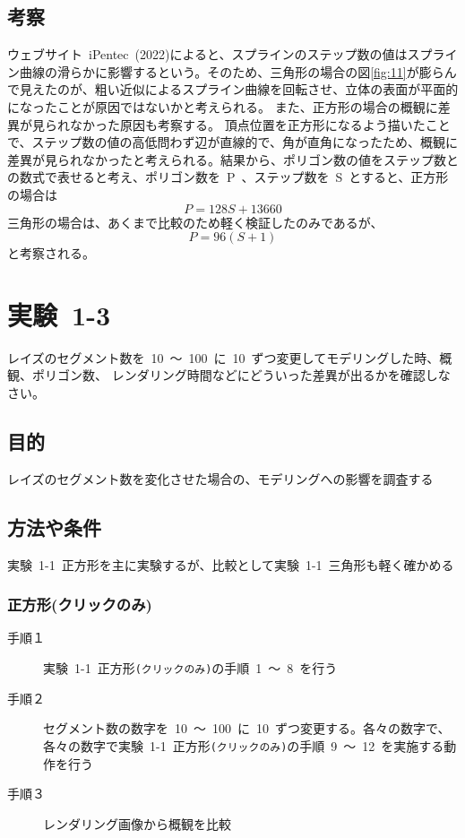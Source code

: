 \documentclass[a4j]{jarticle}
\begin{document}
\subsection{考察}
%
ウェブサイト\ iPentec\ (2022)によると、スプラインのステップ数の値はスプライン曲線の滑らかに影響するという\cite{toritchi}。そのため、三角形の場合の図\ref{fig:11}が膨らんで見えたのが、粗い近似によるスプライン曲線を回転させ、立体の表面が平面的になったことが原因ではないかと考えられる。
また、正方形の場合の概観に差異が見られなかった原因も考察する。
頂点位置を正方形になるよう描いたことで、ステップ数の値の高低問わず辺が直線的で、角が直角になったため、概観に差異が見られなかったと考えられる。結果から、ポリゴン数の値をステップ数との数式で表せると考え、ポリゴン数を\ P\ 、ステップ数を\ S\ とすると、正方形の場合は
\begin{equation}
  P = 128S + 13660
\end{equation}
三角形の場合は、あくまで比較のため軽く検証したのみであるが、
\begin{equation}
  P = 96(S + 1)
\end{equation}
と考察される。
%

\newpage
\section{実験\ 1-3}
レイズのセグメント数を\ 10\ ～\ 100\ に\ 10\ ずつ変更してモデリングした時、概観、ポリゴン数、
レンダリング時間などにどういった差異が出るかを確認しなさい。
\subsection{目的}
%
レイズのセグメント数を変化させた場合の、モデリングへの影響を調査する
%
\subsection{方法や条件}
%
実験\ 1-1\ 正方形を主に実験するが、比較として実験\ 1-1\ 三角形も軽く確かめる
\subsubsection{正方形(クリックのみ)}
\begin{description}
\item[手順１] 実験\ 1-1\ 正方形\verb|(クリックのみ)|の手順\ 1\ ～\ 8\ を行う
\item[手順２] セグメント数の数字を\ 10\ ～\ 100\ に\ 10\ ずつ変更する。各々の数字で、各々の数字で実験\ 1-1\ 正方形\verb|(クリックのみ)|の手順\ 9\ ～\ 12\ を実施する動作を行う
\item[手順３] レンダリング画像から概観を比較 
\end{description}
\end{document}
